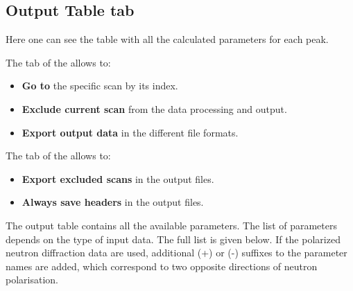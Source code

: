 \newpage
\subsection{Output Table tab}

Here one can see the table with all the calculated parameters for each peak.


The  tab of the  allows to:

\begin{itemize}
	\item \textbf{Go to} the specific scan by its index.
	\item \textbf{Exclude current scan} from the data processing and output.
	\item \textbf{Export output data} in the different file formats.
\end{itemize}
 
The  tab of the  allows to:

\begin{itemize}
	\item \textbf{Export excluded scans} in the output files.
	\item \textbf{Always save headers} in the output files.
\end{itemize}

\newpage
The output table contains all the available parameters. The list of parameters depends on the type of input data. The full list is given below. If the polarized neutron diffraction data are used, additional (+) or (-) suffixes to the parameter names are added, which correspond to two opposite directions of neutron polarisation.
 

